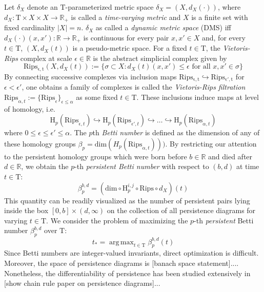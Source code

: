 \documentclass[10pt]{article}
\DeclareMathOperator*{\argmax}{arg\,max}
\begin{document}
Let $\delta_X$ denote an $\mathrm{T}$-parameterized metric space $\delta_X = ( X, d_X(\cdot) )$, where $d_X: \mathrm{T} \times X \times X \to \mathbb{R}_+$ is called a \emph{time-varying metric}  and $X$ is a finite set with fixed cardinality $\lvert X \rvert = n$. $\delta_X$ as called a \emph{dynamic metric space} (DMS) iff $d_X(\cdot)(x, x'): \mathbb{R} \to \mathbb{R}_{+}$ is continuous for every pair $x, x' \in X$ and, for every $t \in \mathrm{T}$, $(X, d_X(t))$ is a pseudo-metric space. 
For a fixed $t \in \mathrm{T}$, the \emph{Vietoris-Rips} complex at scale $\epsilon \in \mathbb{R}$ is the abstract simplicial complex given by 
$$\mathrm{Rips_{\epsilon, t}}(X, d_X(t)) := \{ \sigma \subset X : d_X(t)(x, x') \leq \epsilon \text{ for all } x, x' \in \sigma \} $$ 
\noindent By connecting successive complexes via inclusion maps $\mathrm{Rips_{\epsilon, t}} \hookrightarrow \mathrm{Rips_{\epsilon', t}}$ for $\epsilon < \epsilon'$, one obtains a family of complexes is called the \emph{Vietoris-Rips filtration} $\mathrm{Rips}_{\alpha, t} := \{ \mathrm{Rips}_\epsilon \}_{\epsilon \leq \alpha}$ as some fixed $t \in \mathrm{T}$. 
These inclusions induce maps at level of homology, i.e. 
$$ \mathrm{H}_p(\mathrm{Rips}_{\epsilon, t}) \hookrightarrow \mathrm{H}_p(\mathrm{Rips}_{\epsilon', t}) \hookrightarrow \dots \hookrightarrow \mathrm{H}_p(\mathrm{Rips}_{\alpha, t})$$ 
where $0 \leq \epsilon \leq \epsilon' \leq \alpha$. The $p$th \emph{Betti number} is defined as the dimension of any of these homology groups $\beta_p = \mathrm{dim}(H_p(\mathrm{Rips}_{\alpha, t})))$. By restricting our attention to the persistent homology groups which were born before $b \in \mathbb{R}$ and died after $d \in \mathbb{R}$, we obtain the $p$-th \emph{persistent Betti number} with respect to $(b,d)$ at time $t \in \mathrm{T}$: 
$$ \beta_{p}^{b,d} = \left(\mathrm{dim} \circ \mathrm{H}_p^{i,j} \circ \mathrm{Rips} \circ d_X \right)(t)$$
This quantity can be readily visualized as the number of persistent pairs lying inside the box $[0, b] \times (d, \infty)$  on the collection of all persistence diagrams for varying $t \in \mathrm{T}$.
We consider the problem of maximizing the $p$-th \emph{persistent} Betti number $\beta^{b,d}_p$ over $\mathrm{T}$: 
\begin{equation}
	t_\ast = \argmax_{t \in \mathrm{T}}	 \beta_{p}^{b,d}(t)
\end{equation}
Since Betti numbers are integer-valued invariants, direct optimization is difficult. Moreover, the space of persistence diagrams is [banach space statement]....
Nonetheless, the differentiability of persistence has been studied extensively in [show chain rule paper on persistence diagrams]...
\end{document}
